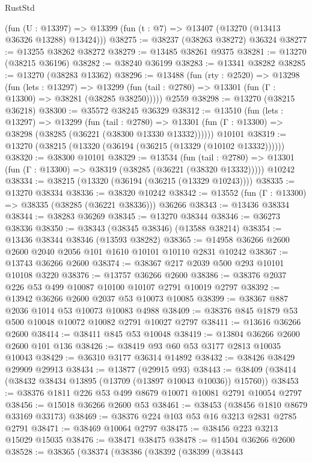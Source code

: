 \begin{lexlean}{RustStd}
\begin{coremodule}
    (fun (U : @13397) => @13399 (fun (t : @7) => @13407 (@13270 (@13413 @36326 @13288) @13424)))
@38275 := @38237 (@38263 @38272) @36324
@38277 := @13255 @38262 @38272
@38279 := @13485 @38261 @9375
@38281 := @13270 (@38215 @36196)
@38282 := @38240 @36199
@38283 := @13341 @38282
@38285 := @13270 (@38283 @13362)
@38296 := @13488
    (fun (rty : @2520) =>
    @13298
      (fun (lets : @13297) =>
      @13299 (fun (tail : @2780) => @13301 (fun (Γ : @13300) => @38281 (@38285 @38250)))))
    @2559
@38298 := @13270 (@38215 @36218)
@38300 := @35572 @38245 @36329
@38312 := @13510
    (fun (lets : @13297) =>
    @13299
      (fun (tail : @2780) =>
      @13301 (fun (Γ : @13300) => @38298 (@38285 (@36221 (@38300 @13330 @13332))))))
    @10101
@38319 := @13270 (@38215 (@13320 (@36194 (@36215 (@13329 (@10102 @13332))))))
@38320 := @38300 @10101
@38329 := @13534
    (fun (tail : @2780) => @13301 (fun (Γ : @13300) => @38319 (@38285 (@36221 (@38320 @13332)))))
    @10242
@38334 := @38215 (@13320 (@36194 (@36215 (@13329 @10243))))
@38335 := @13270 @38334
@38336 := @38320 @10242
@38342 := @13552 (fun (Γ : @13300) => @38335 (@38285 (@36221 @38336))) @36266
@38343 := @13436 @38334
@38344 := @38283 @36269
@38345 := @13270 @38344
@38346 := @36273 @38336
@38350 := @38343 (@38345 @38346) (@13588 @38214)
@38354 := @13436 @38344 @38346 (@13593 @38282)
@38365 := @14958 @36266 @2600 @2600 @2040 @2056 @101 @1610 @10101 @10110 @2831 @10242
@38367 := @13743 @36266 @2600
@38374 := @38367 @217 @2039 @500 @293 @10101 @10108 @3220
@38376 := @13757 @36266 @2600
@38386 := @38376 @2037 @226 @53 @499 @10087 @10100 @10107 @2791 @10019 @2797
@38392 := @13942 @36266 @2600 @2037 @53 @10073 @10085
@38399 := @38367 @887 @2036 @1014 @53 @10073 @10083 @4988
@38409 := @38376 @845 @1879 @53 @500 @10048 @10072 @10082 @2791 @10027 @2797
@38411 := @13616 @36266 @2600
@38414 := @38411 @845 @53 @10048
@38419 := @13804 @36266 @2600 @2600 @101 @136
@38426 := @38419 @93 @60 @53 @3177 @2813 @10035 @10043
@38429 := @36310 @3177 @36314 @14892
@38432 := @38426 @38429 @29909 @29913
@38434 := @13877 (@29915 @93)
@38443 := @38409 (@38414 (@38432 @38434 @13895 (@13709 (@13897 @10043 @10036)) @15760))
@38453 := @38376 @1811 @226 @53 @499 @8679 @10071 @10081 @2791 @10054 @2797
@38456 := @15018 @36266 @2600 @53
@38461 := @38453 (@38456 @1810 @8679 @33169 @33173)
@38469 := @38376 @224 @103 @53 @16 @3213 @2831 @2785 @2791
@38471 := @38469 @10064 @2797
@38475 := @38456 @223 @3213 @15029 @15035
@38476 := @38471 @38475
@38478 := @14504 @36266 @2600
@38528 := @38365
    (@38374
      (@38386
        (@38392
          (@38399
            (@38443

\end{coremodule}
\end{lexlean}
